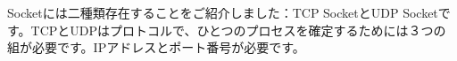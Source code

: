 Socketには二種類存在することをご紹介しました：TCP SocketとUDP Socketです。TCPとUDPはプロトコルで、ひとつのプロセスを確定するためには３つの組が必要です。IPアドレスとポート番号が必要です。
